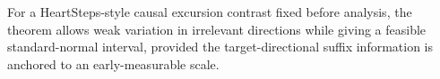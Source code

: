 For a HeartSteps-style causal excursion contrast fixed before analysis, the theorem allows weak variation in irrelevant directions while giving a feasible standard-normal interval, provided the target-directional suffix information is anchored to an early-measurable scale.
